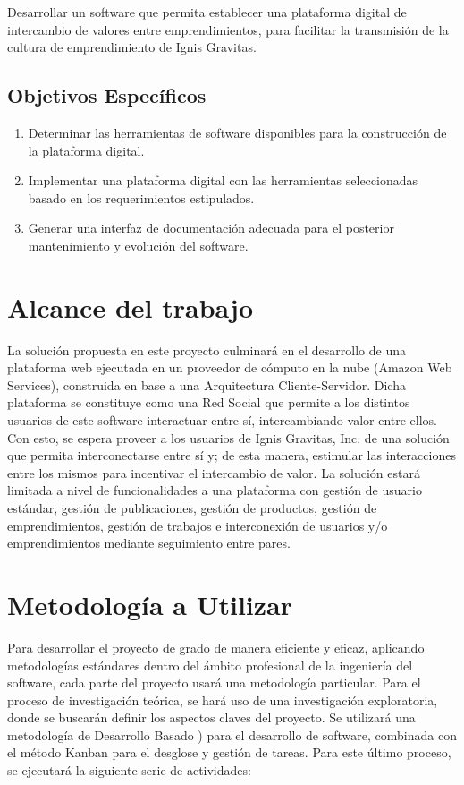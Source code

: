 Desarrollar un software que permita establecer una plataforma digital de intercambio de valores entre emprendimientos, para facilitar la transmisión de la cultura de emprendimiento de Ignis Gravitas.

\subsection*{Objetivos Específicos}

\begin{enumerate}
	\itemsep1pt \parskip0pt 
	\item Determinar las herramientas de software disponibles para la construcción de la plataforma digital.
    \item Implementar una plataforma digital con las herramientas seleccionadas basado en los requerimientos estipulados.
    \item Generar una interfaz de documentación adecuada para el posterior mantenimiento y evolución del software.
\end{enumerate}

\section*{Alcance del trabajo}

La solución propuesta en este proyecto culminará en el desarrollo de una plataforma web ejecutada en un proveedor de cómputo en la nube (Amazon Web Services), construida en base a una Arquitectura Cliente-Servidor. Dicha plataforma se constituye como una Red Social que permite a los distintos usuarios de este software interactuar entre sí, intercambiando valor entre ellos. Con esto, se espera proveer a los usuarios de Ignis Gravitas, Inc. de una solución que permita interconectarse entre sí y; de esta manera, estimular las interacciones entre los mismos para incentivar el intercambio de valor. La solución estará limitada a nivel de funcionalidades a una plataforma con gestión de usuario estándar, gestión de publicaciones, gestión de productos, gestión de emprendimientos, gestión de trabajos e interconexión de usuarios y/o emprendimientos mediante seguimiento entre pares.


\section*{Metodología a Utilizar}

Para desarrollar el proyecto de grado de manera eficiente y eficaz, aplicando metodologías estándares dentro del ámbito profesional de la ingeniería del software, cada parte del proyecto usará una metodología particular. Para el proceso de investigación teórica, se hará uso de una investigación exploratoria, donde se buscarán definir los aspectos claves del proyecto. Se utilizará una metodología de Desarrollo Basado ) para el desarrollo de software, combinada con el método Kanban para el desglose y gestión de tareas. Para este último proceso, se ejecutará la siguiente serie de actividades:

